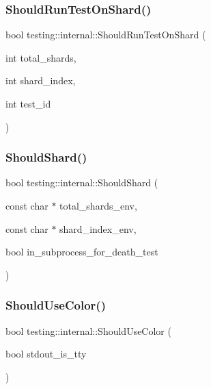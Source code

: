 \mbox{\label{namespacetesting_1_1internal_a437bd89f5bc532778d7467600e210395}} 
\subsubsection{\texorpdfstring{ShouldRunTestOnShard()}{ShouldRunTestOnShard()}}
{\footnotesize\ttfamily bool testing\+::internal\+::\+Should\+Run\+Test\+On\+Shard (\begin{DoxyParamCaption}\item[{int}]{total\+\_\+shards,  }\item[{int}]{shard\+\_\+index,  }\item[{int}]{test\+\_\+id }\end{DoxyParamCaption})}

\mbox{\label{namespacetesting_1_1internal_a8688e48645d951b8e42b61d2e4b2890e}} 
\subsubsection{\texorpdfstring{ShouldShard()}{ShouldShard()}}
{\footnotesize\ttfamily bool testing\+::internal\+::\+Should\+Shard (\begin{DoxyParamCaption}\item[{const char $\ast$}]{total\+\_\+shards\+\_\+env,  }\item[{const char $\ast$}]{shard\+\_\+index\+\_\+env,  }\item[{bool}]{in\+\_\+subprocess\+\_\+for\+\_\+death\+\_\+test }\end{DoxyParamCaption})}

\mbox{\label{namespacetesting_1_1internal_ac1db1b4603967a6c4404f31cbbac31a6}} 
\subsubsection{\texorpdfstring{ShouldUseColor()}{ShouldUseColor()}}
{\footnotesize\ttfamily bool testing\+::internal\+::\+Should\+Use\+Color (\begin{DoxyParamCaption}\item[{bool}]{stdout\+\_\+is\+\_\+tty }\end{DoxyParamCaption})}

